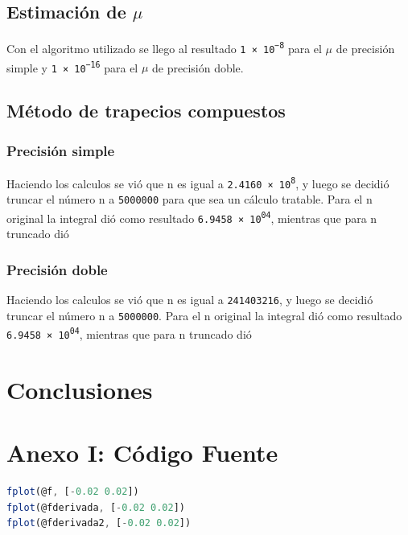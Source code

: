 \documentclass[11pt,a4paper]{article}
\begin{document}
\subsection{Estimación de \( \mu \) }

Con el algoritmo utilizado se llego al resultado \texttt{\num{1e-8}} para el \(\mu\) de precisión simple y \texttt{\num{1e-16}} para el \(\mu\) de precisión doble.

\subsection{Método de trapecios compuestos}

\subsubsection{Precisión simple}

Haciendo los calculos se vió que n es igual a \texttt{\num{2.4160e8}}, y luego se decidió truncar el número n a \texttt{5000000} para que sea un cálculo tratable. Para el n original la integral dió como resultado \texttt{\num{6.9458e+04}}, mientras que para n truncado dió

\subsubsection{Precisión doble}

Haciendo los calculos se vió que n es igual a \texttt{241403216}, y luego se decidió truncar el número n a \texttt{5000000}. Para el n original la integral dió como resultado \texttt{\num{6.9458e+04}}, mientras que para n truncado dió

\section{Conclusiones}

\newpage
\appendix
\section{Anexo I: Código Fuente}



\newpage


\newpage


\newpage
\begin{lstlisting}[language=Octave,title=Generación de graficos]
fplot(@f, [-0.02 0.02])
fplot(@fderivada, [-0.02 0.02])
fplot(@fderivada2, [-0.02 0.02])
\end{lstlisting}
\end{document}
